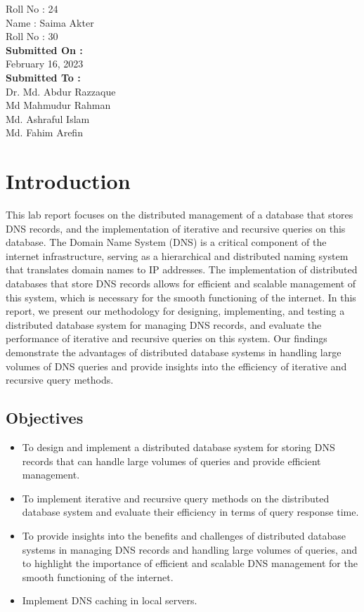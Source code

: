 \documentclass[11pt]{article}
\begin{document}
\begin{titlepage}
\begin{large}
			Roll No : 24\\[12pt]
			Name : Saima Akter\\[8pt]
			Roll No : 30\\[12pt]
		\textbf{Submitted On : \\[12pt]}
			February 16, 2023\\[20pt]
		\textbf{Submitted To :\\[12pt]}
			Dr. Md. Abdur Razzaque\\[12pt]
                Md Mahmudur Rahman\\[12pt]
                Md. Ashraful Islam\\[12pt]
                Md. Fahim Arefin
	\end{large}
\end{titlepage}

\section{Introduction}
This lab report focuses on the distributed management of a database that stores DNS records, and the implementation of iterative and recursive queries on this database. The Domain Name System (DNS) is a critical component of the internet infrastructure, serving as a hierarchical and distributed naming system that translates domain names to IP addresses. The implementation of distributed databases that store DNS records allows for efficient and scalable management of this system, which is necessary for the smooth functioning of the internet. In this report, we present our methodology for designing, implementing, and testing a distributed database system for managing DNS records, and evaluate the performance of iterative and recursive queries on this system. Our findings demonstrate the advantages of distributed database systems in handling large volumes of DNS queries and provide insights into the efficiency of iterative and recursive query methods.

\subsection{Objectives}
\begin{itemize}
    \item To design and implement a distributed database system for storing DNS records that can handle large volumes of queries and provide efficient management.
    \item To implement iterative and recursive query methods on the distributed database system and evaluate their efficiency in terms of query response time.
    \item To provide insights into the benefits and challenges of distributed database systems in managing DNS records and handling large volumes of queries, and to highlight the importance of efficient and scalable DNS management for the smooth functioning of the internet.
    \item Implement DNS caching in local servers.
\end{itemize}
\end{document}
